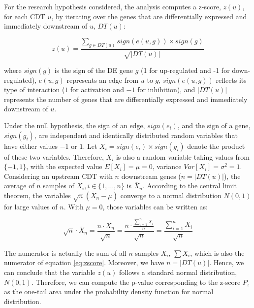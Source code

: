 
For the research hypothesis considered, the analysis computes a z-score, $z(u)$, for each CDT $u$, by iterating over the genes that are differentially expressed and immediately downstream of $u$, $DT(u)$: 


\begin{equation}
\label{eq:zscore}
z(u)=\frac{\sum\limits_{g \in DT(u)} sign(e(u,g)) \times sign(g)}{\sqrt{|DT(u)|}}
\end{equation}

where $sign(g)$ is the sign of the DE gene $g$ (1 for up-regulated and -1 for down-regulated), $e(u,g)$ represents an edge from $u$ to $g$,  $sign(e(u,g))$ reflects its type of interaction ($1$ for activation and $-1$ for inhibition), and $|DT(u)|$ represents the number of genes that are differentially expressed and immediately downstream of $u$. 


Under the null hypothesis, the sign of an edge, $sign(e_i)$, and the sign of a gene, $sign(g_i)$, are independent and identically distributed random variables that have either values $-1$ or $1$.  Let $X_i = sign(e_i) \times sign(g_i)$ denote the product of these two variables. Therefore, $X_i$ is also a random variable taking values from $\{-1,1\}$, with the expected value $E[X_i] = \mu = 0$, variance $Var[X_i] = \sigma^2 = 1$. Considering an upstream CDT with $n$ downstream genes ($n = |DT(u)|$), the  average of $n$ samples of $X_i, i \in \{1,...,n\}$ is $\overline{X}_n$.  According to the central limit theorem, the variables $\sqrt{n}(\overline{X}_n - \mu)$ converge  to a normal distribution $N(0,1)$ for large values of $n$. With $\mu = 0$, those variables can be written as:

\begin{equation}
\sqrt{n} \cdot \overline{X}_n = \frac{n \cdot \overline{X}_n} {\sqrt{n}} = \frac{n \cdot \frac{\sum_{i=1}^n X_i}{n}}{\sqrt{n}} = \frac{\sum_{i=1}^n X_i}{\sqrt{n}}
\end{equation}

The numerator is actually the sum of all $n$ samples $X_i$, $\sum{X_i}$, which is also the numerator of equation \ref{eq:zscore}. 
Moreover, we have $n = |DT(u)|$.
Hence, we can conclude that the variable $z(u)$ follows a standard normal distribution, $N(0,1)$. Therefore, we can compute the p-value corresponding to the z-score $P_z$ as the one-tail area under the probability density function for normal distribution.

